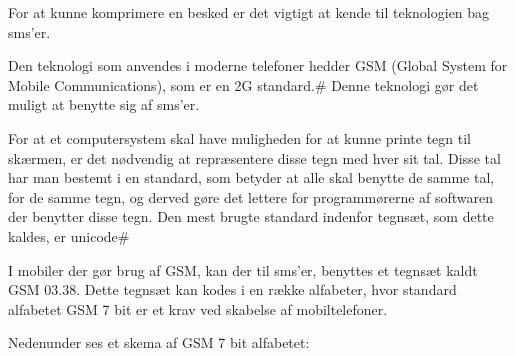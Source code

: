 For at kunne komprimere en besked er det vigtigt at kende til teknologien bag sms’er.

Den teknologi som anvendes i moderne telefoner hedder GSM (Global System for Mobile Communications), som er en 2G standard.# Denne teknologi gør det muligt at benytte sig af sms’er.

For at et computersystem skal have muligheden for at kunne printe tegn til skærmen, er det nødvendig at repræsentere disse tegn med hver sit tal. Disse tal har man bestemt i en standard, som betyder at alle skal benytte de samme tal, for de samme tegn, og derved gøre det lettere for programmørerne af softwaren der benytter disse tegn. Den mest brugte standard indenfor tegnsæt, som dette kaldes, er unicode#

I mobiler der gør brug af GSM, kan der til sms’er, benyttes et tegnsæt kaldt GSM 03.38. Dette tegnsæt kan kodes i en række alfabeter, hvor standard alfabetet GSM 7 bit er et krav ved skabelse af mobiltelefoner.

Nedenunder ses et skema af GSM 7 bit alfabetet:
